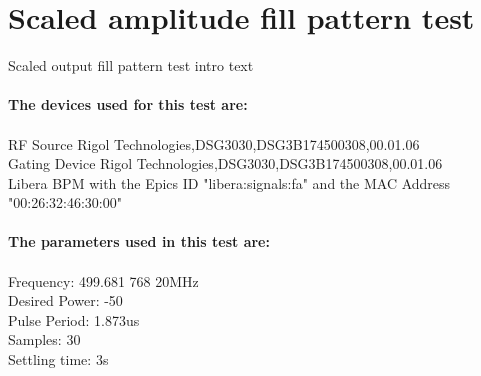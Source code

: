 \documentclass[a4paper, 11pt]{article}%
\begin{document}
\section{Scaled amplitude fill pattern test}%
Scaled output fill pattern test intro text\\\\%
\textbf{The devices used for this test are:}\\\\%
RF Source Rigol Technologies,DSG3030,DSG3B174500308,00.01.06\\%
Gating Device Rigol Technologies,DSG3030,DSG3B174500308,00.01.06\\%
Libera BPM with the Epics ID "libera:signals:fa" and the MAC Address "00:26:32:46:30:00"\\%
\\%
\textbf{The parameters used in this test are:}\\\\%
Frequency: 499.681 768 20MHz\\%
Desired Power: -50\\%
Pulse Period: 1.873us\\%
Samples: 30\\%
Settling time: 3s\\
\end{document}
